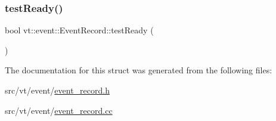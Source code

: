 \mbox{\label{structvt_1_1event_1_1_event_record_a82d8f84b3aa975cd12e1972745491106}} 
\subsubsection{\texorpdfstring{test\+Ready()}{testReady()}}
{\footnotesize\ttfamily bool vt\+::event\+::\+Event\+Record\+::test\+Ready (\begin{DoxyParamCaption}{ }\end{DoxyParamCaption})}



The documentation for this struct was generated from the following files\+:\begin{DoxyCompactItemize}
\item 
src/vt/event/\hyperlink{event__record_8h}{event\+\_\+record.\+h}\item 
src/vt/event/\hyperlink{event__record_8cc}{event\+\_\+record.\+cc}\end{DoxyCompactItemize}
